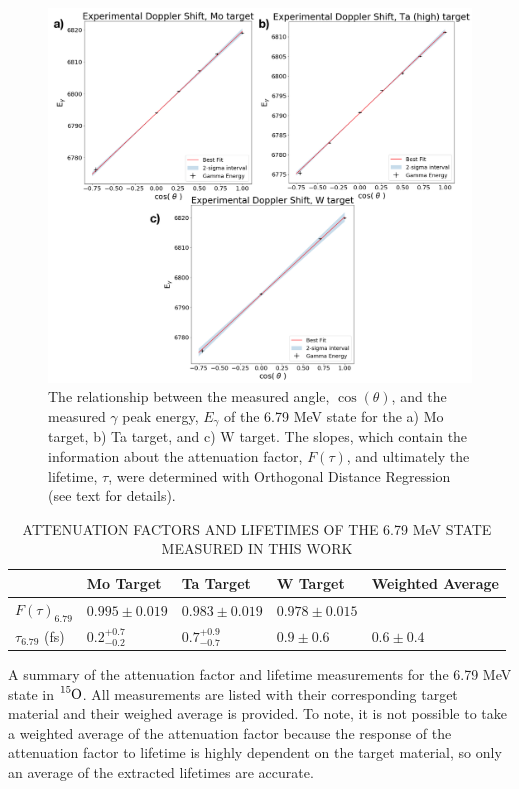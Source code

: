 \begin{figure}
\centering
\includegraphics[width=\linewidth]{figures/doppler679.png}
\caption{The relationship between the measured angle, $\cos(\theta)$, and the measured $\gamma$ peak energy, $E_{\gamma}$ of the 6.79 MeV state for the a) Mo target, b) Ta target, and c) W target. The slopes, which contain the information about the attenuation factor, $F(\tau)$, and ultimately the lifetime, $\tau$, were determined with Orthogonal Distance Regression (see text for details). }
\label{fig: doppler679}
\end{figure}

\begin{table}[]
\caption{ATTENUATION FACTORS AND LIFETIMES OF THE 6.79 MeV STATE MEASURED IN THIS WORK}
\centering
\begin{threeparttable}
\begin{tabular}{@{}lllll@{}}
\toprule
                   & Mo Target & Ta Target & W Target & Weighted Average \\ \midrule
$F(\tau)_{6.79}$   & $0.995 \pm 0.019$   & $ 0.983 \pm 0.019$  & $0.978 \pm 0.015$  &                  \\
$\tau_{6.79}$ (fs) & $0.2^{+0.7}_{-0.2}$ & $0.7^{+0.9}_{-0.7}$ & $0.9 \pm 0.6$      & $0.6 \pm 0.4$    \\ \bottomrule
\end{tabular}
\begin{tablenotes}
\small 
\item A summary of the attenuation factor and lifetime measurements for the 6.79 MeV state in $\ce{^{15}O}$. All measurements are listed with their corresponding target material and their weighed average is provided. To note, it is not possible to take a weighted average of the attenuation factor because the response of the attenuation factor to lifetime is highly dependent on the target material, so only an average of the extracted lifetimes are accurate.
\end{tablenotes}
\end{threeparttable}
\label{table: afTau679}
\end{table}


